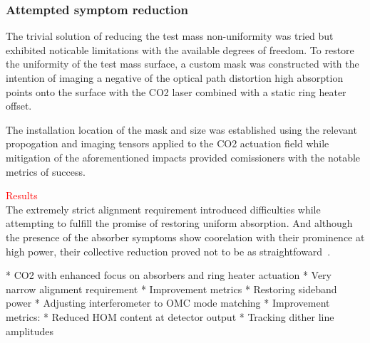 \subsubsection{Attempted symptom reduction}
The trivial solution of reducing the test mass non-uniformity was tried but exhibited noticable limitations with the available degrees of freedom. To restore the uniformity of the test mass surface, a custom mask was constructed with the intention of imaging a negative of the optical path distortion high absorption points onto the surface with the CO2 laser combined with a static ring heater offset. 

The installation location of the mask and size was established using the relevant propogation and imaging tensors applied to the CO2 actuation field while mitigation of the aforementioned impacts provided comissioners with the notable metrics of success.

\textcolor{red}{Results}
\\
The extremely strict alignment requirement introduced difficulties while attempting to fulfill the promise of restoring uniform absorption. And although the presence of the absorber symptoms show coorelation with their prominence at high power, their collective reduction proved not to be as straightfoward~\cite{brooks:aigwd2019, buikema:2020}.
	
	* CO2 with enhanced focus on absorbers and ring heater actuation
		* Very narrow alignment requirement
		* Improvement metrics
			* Restoring sideband power	
	* Adjusting interferometer to OMC mode matching
		* Improvement metrics:
			* Reduced HOM content at detector output
			* Tracking dither line amplitudes



